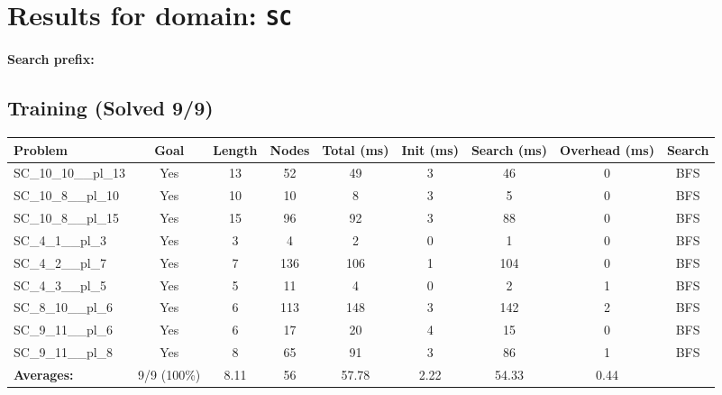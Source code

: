 \documentclass{article}
\begin{document}
\section*{Results for domain: \texttt{SC}}
\textbf{Search prefix:} 
\\[0.5cm]
\subsection*{Training (Solved 9/9)}
\begin{tabular}{lcccccccc}
\toprule
Problem & Goal & Length & Nodes & Total (ms) & Init (ms) & Search (ms) & Overhead (ms) & Search \\
\midrule
SC\_10\_10\_\_pl\_13 & Yes & 13 & 52 & 49 & 3 & 46 & 0 & BFS \\
SC\_10\_8\_\_pl\_10 & Yes & 10 & 10 & 8 & 3 & 5 & 0 & BFS \\
SC\_10\_8\_\_pl\_15 & Yes & 15 & 96 & 92 & 3 & 88 & 0 & BFS \\
SC\_4\_1\_\_pl\_3 & Yes & 3 & 4 & 2 & 0 & 1 & 0 & BFS \\
SC\_4\_2\_\_pl\_7 & Yes & 7 & 136 & 106 & 1 & 104 & 0 & BFS \\
SC\_4\_3\_\_pl\_5 & Yes & 5 & 11 & 4 & 0 & 2 & 1 & BFS \\
SC\_8\_10\_\_pl\_6 & Yes & 6 & 113 & 148 & 3 & 142 & 2 & BFS \\
SC\_9\_11\_\_pl\_6 & Yes & 6 & 17 & 20 & 4 & 15 & 0 & BFS \\
SC\_9\_11\_\_pl\_8 & Yes & 8 & 65 & 91 & 3 & 86 & 1 & BFS \\
\textbf{Averages:} & 9/9 (100\%) & 8.11 & 56 & 57.78 & 2.22 & 54.33 & 0.44 & \\
\bottomrule
\end{tabular}
\\[0.7cm]
\end{document}
